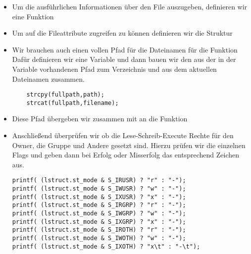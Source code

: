 \begin{itemize}
\begin{lstlisting}[language=C]
	printlstruct(dptr->d_name,loption, ooption);

	if(lstat(dptr->d_name, &lstruct) == 0 &&

	((lstruct.st_mode & S_IXUSR) ||
	(lstruct.st_mode & S_IXGRP) ||

	(lstruct.st_mode & S_IXOTH) ||
	(lstruct.st_mode & S_IEXEC) )){
		printf("\\033[0;31;1m");
	}

	int len = strlen(dptr->d_name);
	const char *last_two = &dptr->d_name[len - 2];
	if (strcmp(last_two, ``.c'') == 0) {
		printf("\\033[0;32;1m");
	}

}
printf("\%s\n", dptr->d_name);
if (loption!=0)
	printf("\\033[0;0;0m");
	}
closedir(dir);
}
}
return NULL;
}
\end{lstlisting}
\item Um die ausführlichen Informationen über den File auszugeben, definieren wir eine Funktion
\newline
{}
\newline
\item Um auf die Fileattribute zugreifen zu können definieren wir die Struktur
\newline {}
\item Wir brauchen auch einen vollen Pfad für die Dateinamen für die Funktion 
Dafür definieren wir eine Variable  und dann
bauen wir den aus der in der Variable  vorhandenen Pfad zum Verzeichnis
und aus dem aktuellen Dateinamen zusammen.
\begin{lstlisting}
	strcpy(fullpath,path);
	strcat(fullpath,filename);
\end{lstlisting}
\item Diese Pfad übergeben wir zusammen mit  an die Funktion
\item Anschließend überprüfen wir ob die Lese-Schreib-Execute Rechte für den
Owner, die Gruppe und Andere gesetzt sind. Hierzu prüfen wir die einzelnen
Flags und geben dann bei Erfolg oder Misserfolg das entsprechend Zeichen aus.

\begin{lstlisting}
printf( (lstruct.st_mode & S_IRUSR) ? "r" : "-");
printf( (lstruct.st_mode & S_IWUSR) ? "w" : "-");
printf( (lstruct.st_mode & S_IXUSR) ? "x" : "-");
printf( (lstruct.st_mode & S_IRGRP) ? "r" : "-");
printf( (lstruct.st_mode & S_IWGRP) ? "w" : "-");
printf( (lstruct.st_mode & S_IXGRP) ? "x" : "-");
printf( (lstruct.st_mode & S_IROTH) ? "r" : "-");
printf( (lstruct.st_mode & S_IWOTH) ? "w" : "-");
printf( (lstruct.st_mode & S_IXOTH) ? "x\t" : "-\t");
\end{lstlisting}


\end{itemize}
